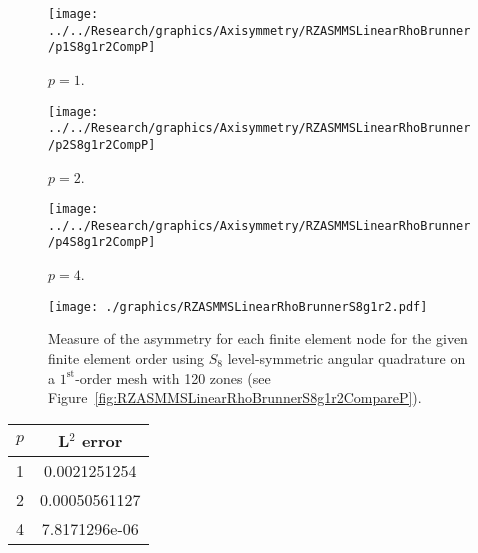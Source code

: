 \documentclass[12pt]{article}
\begin{document}
\begin{sidewaysfigure}[!htb]
\centering
\begin{subfigure}{0.33\textwidth}
\texttt{[image: ../../Research/graphics/Axisymmetry/RZASMMSLinearRhoBrunner/p1S8g1r2CompP]}
\caption{$p=1$.}
\end{subfigure}%
\begin{subfigure}{0.33\textwidth}
\texttt{[image: ../../Research/graphics/Axisymmetry/RZASMMSLinearRhoBrunner/p2S8g1r2CompP]}
\caption{$p=2$.}
\end{subfigure}%
\begin{subfigure}{0.33\textwidth}
\texttt{[image: ../../Research/graphics/Axisymmetry/RZASMMSLinearRhoBrunner/p4S8g1r2CompP]}
\caption{$p=4$.}
\end{subfigure}
\caption{Relative asymmetry for $p=\{1,2,4\}$ finite elements on a $1^\text{st}$-order mesh with 120 zones for $S_8$ level-symmetric angular quadrature.}
\label{fig:RZASMMSLinearRhoBrunnerS8g1r2CompareP}
\end{sidewaysfigure}

\begin{figure}[!htb]
\centering
\texttt{[image: ./graphics/RZASMMSLinearRhoBrunnerS8g1r2.pdf]}
\caption{Measure of the asymmetry for each finite element node for the given finite element order using $S_8$ level-symmetric angular quadrature on a $1^\text{st}$-order mesh with 120 zones (see Figure~\ref{fig:RZASMMSLinearRhoBrunnerS8g1r2CompareP}).}
\label{fig:RZASMMSLinearRhoBrunnerS8g1r2Nodes}
\end{figure}

\begin{table}[!htb]
\centering
{\renewcommand{\arraystretch}{1.5}
\begin{tabular}{|c|c|}
\hline
$p$ & L$^2$ error \\\hline
1 & 0.0021251254 \\\hline
2 & 0.00050561127 \\\hline
4 & 7.8171296e-06 \\\hline
\end{tabular}}
\end{table}

\FloatBarrier
\end{document}
